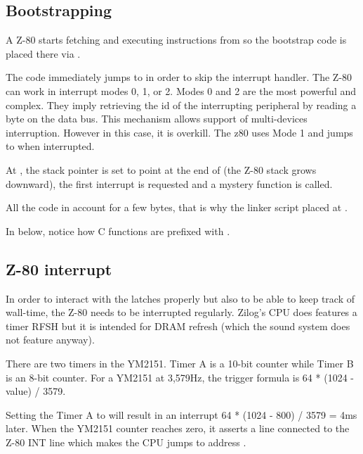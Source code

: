 \subsection{Bootstrapping}
A Z-80 starts fetching and executing instructions from  so the bootstrap code  is placed there via .

The code immediately jumps to  in order to skip the interrupt handler. The Z-80 can work in interrupt modes 0, 1, or 2. Modes 0 and 2 are the most powerful and complex. They imply retrieving the id of the interrupting peripheral by reading a byte on the data bus. This mechanism allows support of multi-devices interruption. However in this case, it is overkill. The z80 uses Mode 1 and jumps to  when interrupted.

At , the stack pointer  is set to point at the end of  (the Z-80 stack grows downward), the first interrupt is requested and a mystery  function is called.

All the code in  account for a few bytes, that is why the linker script placed  at .

In  below, notice how C functions are prefixed with \icode{\_}.
\pagebreak









\subsection{Z-80 interrupt}
In order to interact with the latches properly but also to be able to keep track of wall-time, the Z-80 needs to be interrupted regularly. Zilog's CPU does features a timer RFSH but it is intended for DRAM refresh (which the sound system does not feature anyway).

There are two timers in the YM2151. Timer A is a 10-bit counter while Timer B is an 8-bit counter. For a YM2151 at 3,579Hz, the trigger formula is 64 * (1024 - value) / 3579.

Setting the Timer A to  will result in an interrupt 64 * (1024 - 800) / 3579 = 4ms later. When the YM2151 counter reaches zero, it asserts a line connected to the Z-80 INT line which makes the CPU jumps to address .



